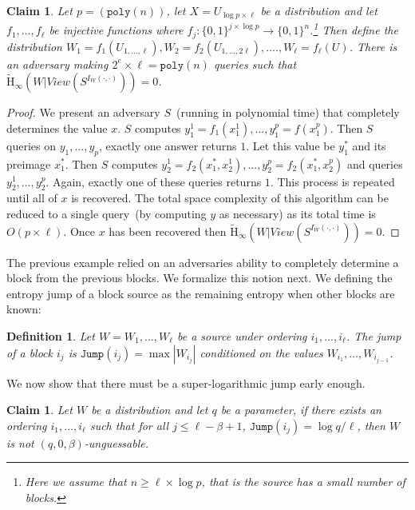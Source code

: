 \documentclass[11pt]{article}
\newcommand{\zo}{\ensuremath{\{0, 1\}}}
\newcommand{\poly}{\ensuremath{\mathtt{poly}}\xspace}
\newcommand{\Hav}{\tilde{\mathrm{H}}_\infty}
\newtheorem{definition}[theorem]{Definition}
\newtheorem{claim}[theorem]{Claim}
\begin{document}
\begin{claim}
Let $p = (\poly(n))$, let $X = U_{\log p\times \ell}$ be a distribution and let $f_1,..., f_{\ell}$ be injective functions where $f_j:\zo^{j\times \log p}\rightarrow \zo^n$.\footnote{Here we assume that $n\ge \ell \times \log p$, that is the source has a small number of blocks.}  Then define the distribution $W_1 = f_1(U_{1,...,\ell}), W_2 = f_2(U_{1,..., 2\ell}),...., W_\ell = f_\ell(U)$.  There is an adversary making $2^e\times \ell = \poly(n)$ queries such that $\Hav(W | View(S^{I_W(\cdot, \cdot)})) = 0$.
\end{claim}
\begin{proof}
We present an adversary $S$~(running in polynomial time) that completely determines the value $x$.  $S$ computes $y_1^1 = f_1(x_1^1),..., y_1^p = f(x_1^p)$.  Then $S$ queries on $y_1,..., y_p$, exactly one answer returns $1$.  Let this value be $y_1^*$ and its preimage $x_1^*$.  Then $S$ computes $y_2^1 = f_2(x_1^*,x_2^1), ..., y_2^p= f_2(x_1^*, x_2^p)$ and queries $y_2^1,..., y_2^p$.  Again, exactly one of these queries returns $1$.  This process is repeated until all of $x$ is recovered.  The total space complexity of this algorithm can be reduced to a single query~(by computing $y$ as necessary) as its total time is $O(p\times \ell)$.  Once $x$ has been recovered then $\Hav(W | View(S^{I_W(\cdot, \cdot)})) = 0$.
\end{proof}

The previous example relied on an adversaries ability to completely determine a block from the previous blocks.  We formalize this notion next.  We defining the entropy jump of a block source as the remaining entropy when other blocks are known:

\begin{definition}
Let $W = W_1,..., W_\ell$ be a source under ordering $i_1,..., i_\ell$.  The \emph{jump} of a block $i_j$ is $\mathtt{Jump}(i_j) = \max|W_{i_j} |$ conditioned on the values $W_{i_1},..., W_{i_{j-1}}$.
\end{definition}

\noindent
We now show that there must be a super-logarithmic jump early enough.

\begin{claim}
Let $W$ be a distribution and let $q$ be a parameter, if there exists an ordering $i_1,..., i_\ell$ such that for all $j\le \ell-\beta +1$, $\mathtt{Jump}(i_j) = \log q /\ell$, then $W$ is not $(q, 0, \beta)$-unguessable.
\end{claim}
\end{document}
